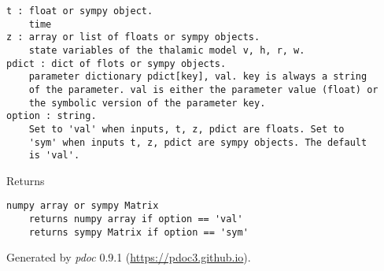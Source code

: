 \documentclass[english,a4paper,oneside]{article}
\begin{document}
\begin{verbatim}
t : float or sympy object.
    time
z : array or list of floats or sympy objects.
    state variables of the thalamic model v, h, r, w.
pdict : dict of flots or sympy objects.
    parameter dictionary pdict[key], val. key is always a string
    of the parameter. val is either the parameter value (float) or 
    the symbolic version of the parameter key.
option : string.
    Set to 'val' when inputs, t, z, pdict are floats. Set to
    'sym' when inputs t, z, pdict are sympy objects. The default
    is 'val'.
\end{verbatim}

Returns

\begin{verbatim}
numpy array or sympy Matrix
    returns numpy array if option == 'val'
    returns sympy Matrix if option == 'sym'
\end{verbatim}

Generated by \emph{pdoc} 0.9.1 (\url{https://pdoc3.github.io}).
\end{document}
